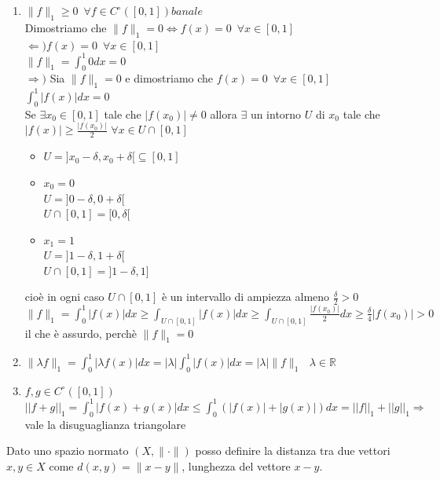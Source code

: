 \documentclass{article}
\newcommand{\R}{\mathbb{R}}
\begin{document}
\begin{enumerate}
    \item $\parallel f \parallel_1 \geq 0\,\,\, \forall f\in C^\circ([0,1]) banale$\\
    Dimostriamo che $\parallel f \parallel_1=0 \Leftrightarrow f(x)=0\,\,\, \forall x\in[0,1]$\\
    $\Leftarrow) f(x)=0\,\,\, \forall x \in[0,1]$\\
    $\parallel f \parallel_1 =\int_{0}^{1}0dx=0$\\
    $\Rightarrow)$ Sia $\parallel f\parallel_1=0$ e dimostriamo che $f(x)=0\,\,\, \forall x \in [0,1]$\\
    $\int_{0}^{1}|f(x)|dx=0$\\
    Se $\exists x_0 \in [0,1]$ tale che $|f(x_0)|\neq 0$ allora $\exists$ un intorno $U$ di $x_0 $ tale che $|f(x)| \geq \frac{|f(x_0)|}{2}$ $\forall x \in U \cap [0,1]$ 
        \begin{itemize}
            \item $U=]x_0-\delta, x_0+\delta[ \subseteq [0,1]$
            \item $x_0=0$\\ $U=]0-\delta,0+\delta[$\\
                  $U \cap [0,1]=[0,\delta[$
            \item $x_1=1$\\ $U=]1-\delta,1+\delta[$\\
            $U \cap [0,1]=]1-\delta,1]$
        \end{itemize}
        cioè in ogni caso $U \cap [0,1]$ è un intervallo di ampiezza almeno $\frac{\delta}{2}>0$\\
        $\parallel f\parallel_1=\int_{0}^{1} |f(x)|dx \geq \int_{U \cap [0,1]} |f(x)|dx \geq \int_{U\cap [0,1]} \frac{|f(x_0)|}{2}dx \geq \frac{\delta}{4}|f(x_0)|>0$\\
        il che è assurdo, perchè $\parallel f\parallel_1=0$
    \item $\parallel \lambda f\parallel_1=\int_{0}^{1}|\lambda f(x)|dx= |\lambda|\int_{0}^{1}|f(x)|dx = |\lambda|\parallel f\parallel_1\,\,\,\, \lambda\in \R$
    \item $f,g \in C^\circ([0,1])$\\
        $||f+g||_1=\int_{0}^{1}|f(x)+g(x)|dx \leq \int_{0}^{1}(|f(x)|+|g(x)|)dx = ||f||_1+||g||_1 \Rightarrow$ vale la disuguaglianza triangolare
\end{enumerate}
Dato uno spazio normato $(X,\parallel\cdot\parallel)$ posso definire la distanza tra due vettori $x,y \in X$ come $d(x,y)= \parallel x-y\parallel$, lunghezza del vettore $x-y$.
\end{document}
